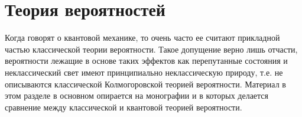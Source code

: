 \chapter{Теория вероятностей}
Когда говорят о квантовой механике, то очень часто ее считают
прикладной частью классической теории вероятности. Такое допущение
верно лишь отчасти, вероятности лежащие в основе таких эффектов как
перепутанные состояния и неклассический свет имеют принципиально
неклассическую природу, т.е. не описываются классической
Колмогоровской теорией вероятности. Материал в этом разделе в основном
опирается на монографии \cite{bHolevo2003} и \cite{bHolevo2003add} в
которых делается 
сравнение между классической и квантовой теорией вероятности.







